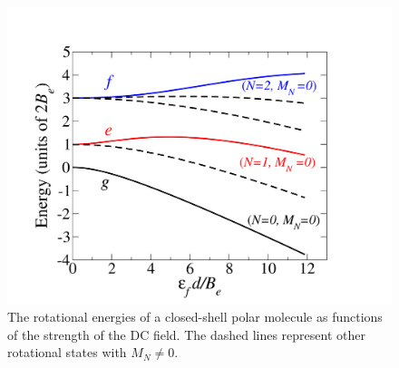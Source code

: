 \begin{figure}[ht]
\centering
\includegraphics[width=\linewidth]{Figure3.pdf}
\caption{The rotational energies of a closed-shell polar molecule as functions of the strength of the DC field. The
 dashed lines represent other rotational states with $M_{N} \neq 0$. 
}
\label{fig:rotationalEnergy}
\end{figure}

